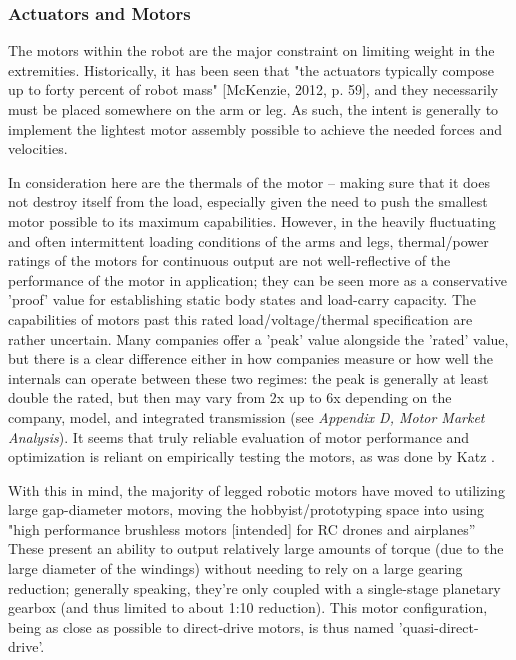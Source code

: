 \documentclass{article}
\begin{document}

\subsubsection{Actuators and Motors}

The motors within the robot are the major constraint on limiting weight in the extremities. Historically, it has been seen that "the actuators typically compose up to forty percent of robot mass" [McKenzie, 2012, p. 59], and they necessarily must be placed somewhere on the arm or leg. As such, the intent is generally to implement the lightest motor assembly possible to achieve the needed forces and velocities.

In consideration here are the thermals of the motor -- making sure that it does not destroy itself from the load, especially given the need to push the smallest motor possible to its maximum capabilities. However, in the heavily fluctuating and often intermittent loading conditions of the arms and legs, thermal/power ratings of the motors for continuous output are not well-reflective of the performance of the motor in application; they can be seen more as a conservative 'proof' value for establishing static body states and load-carry capacity. The capabilities of motors past this rated load/voltage/thermal specification are rather uncertain. Many companies offer a 'peak' value alongside the 'rated' value, but there is a clear difference either in how companies measure or how well the internals can operate between these two regimes: the peak is generally at least double the rated, but then may vary from 2x up to 6x depending on the company, model, and integrated transmission (see \textit{Appendix D, Motor Market Analysis}). It seems that truly reliable evaluation of motor performance and optimization is reliant on empirically testing the motors, as was done by Katz \cite{katz_low_2018}.

With this in mind, the majority of legged robotic motors have moved to utilizing large gap-diameter motors, moving the hobbyist/prototyping space into using "high performance brushless motors [intended] for RC drones and airplanes” \cite{katz_low_2018} %
These present an ability to output relatively large amounts of torque (due to the large diameter of the windings) without needing to rely on a large gearing reduction; generally speaking, they're only coupled with a single-stage planetary gearbox (and thus limited to about 1:10 reduction). This motor configuration, being as close as possible to direct-drive motors, is thus named 'quasi-direct-drive'.
\end{document}
